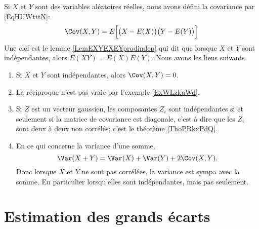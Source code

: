 Si \( X\) et \( Y\) sont des variables aléatoires réelles, nous avons défini la covariance par \eqref{EqHUWtttN}:
\begin{equation}   
    \Cov(X,Y)=E\Big[ \big( X-E(X) \big)\big( Y-E(Y) \big) \Big]
\end{equation}
Une clef est le lemme \ref{LemEXYEXEYprodindep} qui dit que lorsque \( X\) et \( Y\) sont indépendantes, alors \( E(XY)=E(X)E(Y)\). Nous avons les liens suivants.
\begin{enumerate}
    \item
        Si \( X\) et \( Y\) sont indépendantes, alors \( \Cov(X,Y)=0\).
    \item
        La réciproque n'est pas vraie par l'exemple \ref{ExWLzkuWd}.
    \item
        Si \( Z\) est un vecteur gaussien, les composantes \( Z_i\) sont indépendantes si et seulement si la matrice de covariance est diagonale, c'est à dire que les \( Z_i\) sont deux à deux non corrélés; c'est le théorème \ref{ThoPRkxPdQ}.
    \item 
        En ce qui concerne la variance d'une somme,
        \begin{equation}
            \Var(X+Y)=\Var(X)+\Var(Y)+2\Cov(X,Y).
        \end{equation}
        Donc lorsque \( X\) et \( Y\) ne sont pas corrélées, la variance est sympa avec la somme. En particulier lorsqu'elles sont indépendantes, mais pas seulement.
\end{enumerate}

\section{Estimation des grands écarts}

